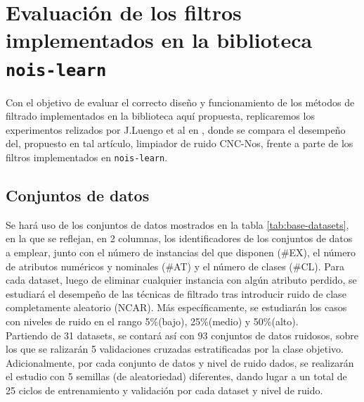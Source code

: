 \documentclass[print, color]{ugrTFG}
\begin{document}
 \section{Evaluación de los filtros implementados en la biblioteca \texttt{nois-learn}}
 Con el objetivo de evaluar el correcto diseño y funcionamiento de los métodos de filtrado implementados en la biblioteca aquí propuesta, replicaremos los experimentos relizados por J.Luengo et al en \cite{LUENGO201827}, donde se compara el desempeño del, propuesto en tal artículo, limpiador de ruido CNC-Nos, frente a  parte de los filtros implementados en \texttt{nois-learn}.
 
 \subsection{Conjuntos de datos}
 Se hará uso de los conjuntos de datos mostrados en la tabla \ref{tab:base-datasets}, en la que se reflejan, en 2 columnas, los identificadores de los conjuntos de  datos a emplear, junto con el número de instancias del que disponen (\#EX), el número de atributos numéricos y nominales (\#AT) y el número de clases (\#CL). Para cada dataset, luego de eliminar cualquier instancia con algún atributo perdido, se estudiará el desempeño de las técnicas de filtrado tras introducir ruido de clase completamente aleatorio (NCAR). Más específicamente, se estudiarán los casos con niveles de ruido en el rango 5\%(bajo), 25\%(medio) y 50\%(alto).\\

 Partiendo de 31 datasets, se contará así con 93 conjuntos de datos ruidosos, sobre los que se ralizarán 5 validaciones cruzadas estratificadas por la clase objetivo. Adicionalmente, por cada conjunto de datos y nivel de ruido dados, se realizarán el estudio con 5 semillas (de aleatoriedad) diferentes, dando lugar a un total de 25 ciclos de entrenamiento y validación por cada dataset y nivel de ruido.
\end{document}
